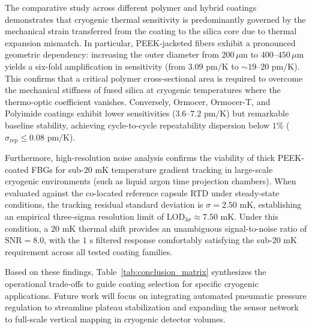 \documentclass[preprint,11pt]{elsarticle}
\begin{document}
The comparative study across different polymer and hybrid coatings demonstrates that cryogenic thermal sensitivity is predominantly governed by the mechanical strain transferred from the coating to the silica core due to thermal expansion mismatch. In particular, PEEK-jacketed fibers exhibit a pronounced geometric dependency: increasing the outer diameter from $200\,\mu\text{m}$ to $400\text{--}450\,\mu\text{m}$ yields a six-fold amplification in sensitivity (from $3.09\text{ pm/K}$ to $\sim 19\text{--}20\text{ pm/K}$). This confirms that a critical polymer cross-sectional area is required to overcome the mechanical stiffness of fused silica at cryogenic temperatures where the thermo-optic coefficient vanishes. Conversely, Ormocer, Ormocer-T, and Polyimide coatings exhibit lower sensitivities ($3.6\text{--}7.2\text{ pm/K}$) but remarkable baseline stability, achieving cycle-to-cycle repeatability dispersion below $1\%$ ($\sigma_{\text{rep}} \le 0.08\text{ pm/K}$).

Furthermore, high-resolution noise analysis confirms the viability of thick PEEK-coated FBGs for sub-$20\text{ mK}$ temperature gradient tracking in large-scale cryogenic environments (such as liquid argon time projection chambers). When evaluated against the co-located reference capsule RTD under steady-state conditions, the tracking residual standard deviation is $\sigma = 2.50\text{ mK}$, establishing an empirical three-sigma resolution limit of $\text{LOD}_{3\sigma} \approx 7.50\text{ mK}$. Under this condition, a $20\text{ mK}$ thermal shift provides an unambiguous signal-to-noise ratio of $\text{SNR} = 8.0$, with the $1\text{ s}$ filtered response comfortably satisfying the sub-$20\text{ mK}$ requirement across all tested coating families.

Based on these findings, Table~\ref{tab:conclusion_matrix} synthesizes the operational trade-offs to guide coating selection for specific cryogenic applications. Future work will focus on integrating automated pneumatic pressure regulation to streamline plateau stabilization and expanding the sensor network to full-scale vertical mapping in cryogenic detector volumes.
\end{document}
